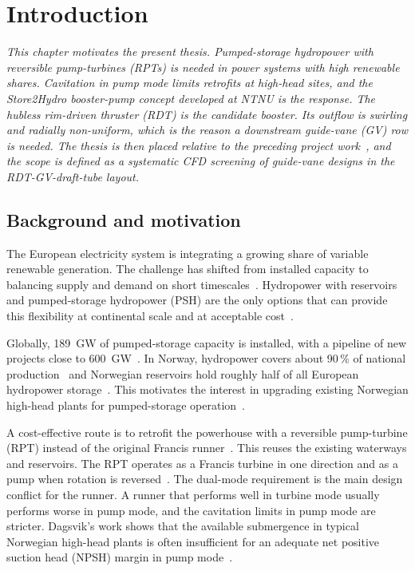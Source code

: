 \chapter{Introduction}
\label{chap:introduction}

\begin{center} %
\singlespacing\parbox{12cm}{\textit{
This chapter motivates the present thesis. Pumped-storage hydropower with reversible pump-turbines (RPTs) is needed in power systems with high renewable shares. Cavitation in pump mode limits retrofits at high-head sites, and the Store2Hydro booster-pump concept developed at NTNU is the response. The hubless rim-driven thruster (RDT) is the candidate booster. Its outflow is swirling and radially non-uniform, which is the reason a downstream guide-vane (GV) row is needed. The thesis is then placed relative to the preceding project work~\cite{Leonsen2025}, and the scope is defined as a systematic CFD screening of guide-vane designs in the RDT-GV-draft-tube layout.
}}
\end{center}

\section{Background and motivation}
\label{sec:background_motivation}

The European electricity system is integrating a growing share of variable renewable generation. The challenge has shifted from installed capacity to balancing supply and demand on short timescales~\cite{IEA_Renewables2023, EC_EGD_2021}. Hydropower with reservoirs and pumped-storage hydropower (PSH) are the only options that can provide this flexibility at continental scale and at acceptable cost~\cite{IRENA_Storage2017}.

Globally, 189~GW of pumped-storage capacity is installed, with a pipeline of new projects close to 600~GW~\cite{IHA_WHO_2025}. In Norway, hydropower covers about 90\,\% of national production~\cite{RegjeringenVannkrafthistorie2019} and Norwegian reservoirs hold roughly half of all European hydropower storage~\cite{NVE_Fleksibilitet2023}. This motivates the interest in upgrading existing Norwegian high-head plants for pumped-storage operation~\cite{DagsvikStorli2021}.

A cost-effective route is to retrofit the powerhouse with a reversible pump-turbine (RPT) instead of the original Francis runner~\cite{DagsvikStorli2021}. This reuses the existing waterways and reservoirs. The RPT operates as a Francis turbine in one direction and as a pump when rotation is reversed~\cite{Olimstad2012}. The dual-mode requirement is the main design conflict for the runner. A runner that performs well in turbine mode usually performs worse in pump mode, and the cavitation limits in pump mode are stricter. Dagsvik's work shows that the available submergence in typical Norwegian high-head plants is often insufficient for an adequate net positive suction head (NPSH) margin in pump mode~\cite{DagsvikThesis2024}.

